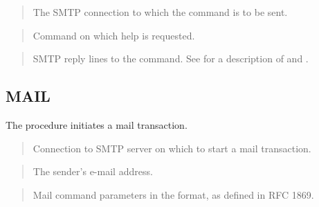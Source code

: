 \documentclass[letterpaper,10pt,english,openany,oneside]{sphinxmanual}
\begin{document}

\begin{quote}

The SMTP connection to which the command is to be sent.
\end{quote}

\begin{quote}

Command on which help is requested.
\end{quote}

\begin{quote}

SMTP reply lines to the command. See {\hyperref[\detokenize{utl_smtp:reply-replies}]{}} for a description
of  and .
\end{quote}


\subsection{MAIL}
\label{\detokenize{utl_smtp:mail}}
The  procedure initiates a mail transaction.
\begin{quote}


\end{quote}


\begin{quote}

Connection to SMTP server on which to start a mail transaction.
\end{quote}

\begin{quote}

The sender’s e-mail address.
\end{quote}

\begin{quote}

Mail command parameters in the format,  as defined in RFC 1869.
\end{quote}
\end{document}
